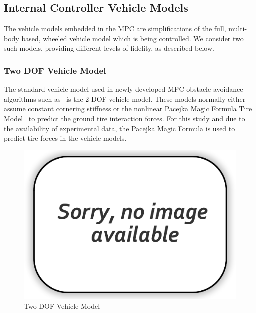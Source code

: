\documentclass[12pt,twocolumn]{article}
\newcommand{\CHRONO}{{\sffamily{{Chrono}}}}
\begin{document}

\subsection{Internal Controller Vehicle Models}\label{ss:IntModel}

The vehicle models embedded in the MPC are simplifications of the full, multi-body based, {\CHRONO} wheeled vehicle model which is being controlled.  We consider two such models, providing different levels of fidelity, as described below.


\subsubsection{Two DOF Vehicle Model}\label{sss:2DOFModel}
The standard vehicle model used in newly developed MPC obstacle avoidance algorithms such as~\cite{ModelFidelity2016} is the 2-DOF vehicle model. These models normally either assume constant cornering stiffness or the nonlinear Pacejka Magic Formula Tire Model~\cite{foo} to predict the ground tire interaction forces. For this study and due to the availability of experimental data, the Pacejka Magic Formula is used to predict tire forces in the vehicle models.   

\begin{figure}
	\centering
	\includegraphics[width=\columnwidth]{Figs/no-image.png}
	\caption{\small Two DOF Vehicle Model}  
	\label{fig:2DOF}
\end{figure}
\end{document}
